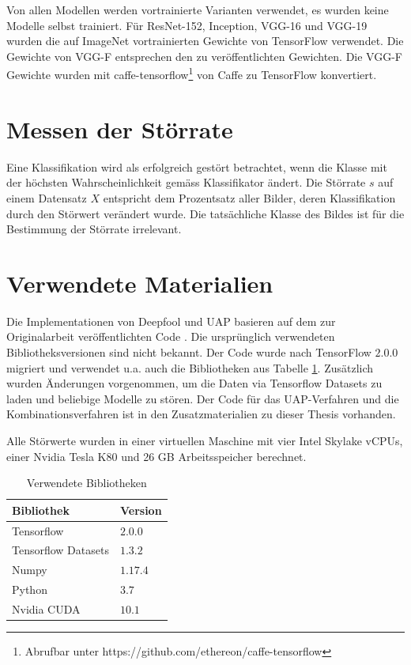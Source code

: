 \documentclass{FFHS_Thesis_Additions/ffhsthesis}
\begin{document}
Von allen Modellen werden vortrainierte Varianten verwendet, es wurden keine Modelle selbst trainiert. 
Für ResNet-152, Inception, VGG-16 und VGG-19 wurden die auf ImageNet \cite{russakovsky_imagenet_2015} vortrainierten Gewichte von TensorFlow \cite{martin_abadi_tensorflow_2015} verwendet. 
Die Gewichte von VGG-F entsprechen den zu \cite{chatfield_return_2014} veröffentlichten Gewichten. 
Die VGG-F Gewichte wurden mit caffe-tensorflow\footnote[1]{Abrufbar unter https://github.com/ethereon/caffe-tensorflow} von Caffe \cite{jia_caffe:_2014} zu TensorFlow konvertiert.

\section{Messen der Störrate}
\label{c_messen_stoerrate}

Eine Klassifikation wird als erfolgreich gestört betrachtet, wenn die Klasse mit der höchsten Wahrscheinlichkeit gemäss Klassifikator ändert. 
Die Störrate $s$ auf einem Datensatz $X$ entspricht dem Prozentsatz aller Bilder, deren Klassifikation durch den Störwert verändert wurde.
Die tatsächliche Klasse des Bildes ist für die Bestimmung der Störrate irrelevant.


\section{Verwendete Materialien}

Die Implementationen von Deepfool und UAP basieren auf dem zur Originalarbeit veröffentlichten Code \cite{moosavi-dezfooli_universal_2017-1, moosavi-dezfooli_deepfool_2016}. Die ursprünglich verwendeten Bibliotheksversionen sind nicht bekannt. Der Code wurde nach TensorFlow $2.0.0$ migriert und verwendet u.a. auch die Bibliotheken aus Tabelle \ref{tbl_verwendeteBibliotheken}. Zusätzlich wurden Änderungen vorgenommen, um die Daten via Tensorflow Datasets zu laden und beliebige Modelle zu stören. Der Code für das UAP-Verfahren und die Kombinationsverfahren ist in den Zusatzmaterialien zu dieser Thesis vorhanden.

Alle Störwerte wurden in einer virtuellen Maschine mit vier Intel Skylake vCPUs, einer Nvidia Tesla K80 und 26 GB Arbeitsspeicher berechnet.

\begin{table}[]
\centering
\caption{Verwendete Bibliotheken}
\begin{tabular}{|l|l|}
\hline
Bibliothek          & Version   \\ \hline
Tensorflow          & $2.0.0$   \\
Tensorflow Datasets & $1.3.2$   \\
Numpy               & $1.17.4$  \\
Python              & $3.7$     \\
Nvidia CUDA         & $10.1$    \\
\hline 
\end{tabular}
\label{tbl_verwendeteBibliotheken}
\end{table}
\end{document}
